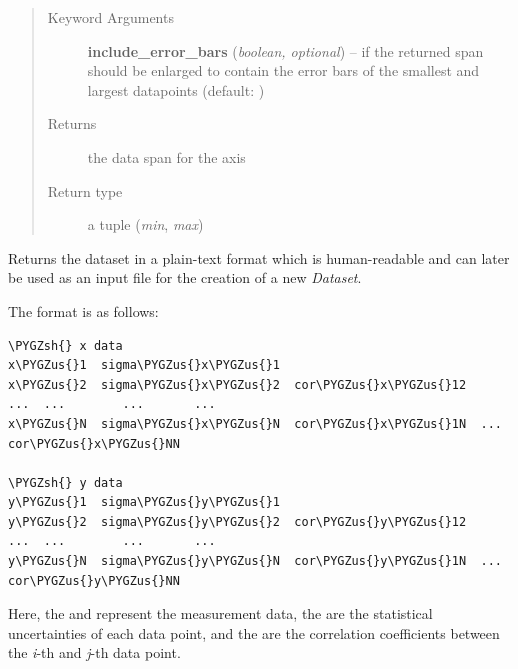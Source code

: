 \documentclass[a4paper,10pt,english]{sphinxmanual}
\def\PYGZus{\char`\_}
\def\PYGZsh{\char`\#}
\begin{document}
\begin{fulllineitems}
\begin{fulllineitems}
\begin{quote}
\begin{description}
\item[{Keyword Arguments}] \leavevmode
\textbf{include\_error\_bars} (\emph{boolean, optional}) --
 if the returned span should be enlarged to
contain the error bars of the smallest and largest datapoints
(default: )

\item[{Returns}] \leavevmode
the data span for the axis

\item[{Return type}] \leavevmode
a tuple (\emph{min}, \emph{max})

\end{description}\end{quote}

\end{fulllineitems}


\begin{fulllineitems}
\label{module_doc:kafe.dataset.Dataset.get_formatted}
Returns the dataset in a plain-text format which is human-readable and
can later be used as an input file for the creation of a new \emph{Dataset}.

The format is as follows:

\begin{Verbatim}[commandchars=\\\{\}]
\PYGZsh{} x data
x\PYGZus{}1  sigma\PYGZus{}x\PYGZus{}1
x\PYGZus{}2  sigma\PYGZus{}x\PYGZus{}2  cor\PYGZus{}x\PYGZus{}12
...  ...        ...       ...
x\PYGZus{}N  sigma\PYGZus{}x\PYGZus{}N  cor\PYGZus{}x\PYGZus{}1N  ...  cor\PYGZus{}x\PYGZus{}NN

\PYGZsh{} y data
y\PYGZus{}1  sigma\PYGZus{}y\PYGZus{}1
y\PYGZus{}2  sigma\PYGZus{}y\PYGZus{}2  cor\PYGZus{}y\PYGZus{}12
...  ...        ...       ...
y\PYGZus{}N  sigma\PYGZus{}y\PYGZus{}N  cor\PYGZus{}y\PYGZus{}1N  ...  cor\PYGZus{}y\PYGZus{}NN
\end{Verbatim}

Here, the  and  represent the measurement data, the
 are the statistical uncertainties of each data point, and
the  are the correlation coefficients between the \emph{i}-th
and \emph{j}-th data point.


\end{fulllineitems}
\end{fulllineitems}
\end{document}
